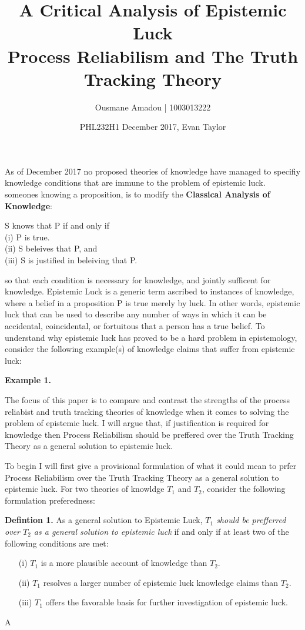 \documentclass{article}
\title{%
  A Critical Analysis of Epistemic Luck \\
  \large Process Reliabilism and The Truth Tracking Theory }
\author{Ousmane Amadou | 1003013222}
\date{PHL232H1 December 2017, Evan Taylor}
\begin{document}
\maketitle

As of December 2017 no proposed theories of knowledge have managed
to specifiy knowledge conditions that are immune to the problem of
epistemic luck. %
someones knowing a proposition, is to modify the \textbf{Classical Analysis of Knowledge}:
\begin{displayquote} %
   S knows that P if and only if \\
  (i) P is true. \\
  (ii) S beleives that P, and \\
  (iii) S is justified in beleiving that P.
\end{displayquote} so that each condition is necessary for knowledge, and jointly
sufficent for knowledge. Epistemic Luck is a generic term ascribed to instances of
knowledge, where a belief in a proposition P is true merely by luck. In other words,
epistemic luck that can be used to describe any number of ways in which it can be
accidental, coincidental, or fortuitous that a person has a true belief. To understand why epistemic luck has
proved to be a hard problem in epistemology, consider the following example(s) of knowledge claims
that suffer from epistemic luck:

\begin{displayquote}
\textbf{Example 1.}
\end{displayquote}
The focus of this paper is to compare and contrast the strengths of the process reliabist and
truth tracking theories of knowledge when it comes to solving the problem
of epistemic luck. I will argue that, if justification is required for
knowledge then Process Reliabilism should be preffered over the Truth Tracking
Theory as a general solution to epistemic luck.

To begin I will first give a provisional formulation of what it could mean to
prfer Process Reliabilism over the Truth Tracking Theory as a general solution to epistemic luck.
For two theories of knowldge $T_{1}$ and $T_{2}$, consider the following
formulation preferedness:
\begin{displayquote}
    \textbf{Defintion 1.} As a general solution to Epistemic Luck,
    \textit{$T_{1}$ should be prefferred over $T_{2}$ as a general solution
    to epistemic luck} if and only if at least two of the following conditions are met:
    \begin{enumerate}
        \item[(i)] $T_{1}$ is a more plausible account of knowledge than $T_{2}$.
        \item[(ii)] $T_{1}$ resolves a larger number of epistemic luck knowledge claims than $T_{2}$.
        \item[(iii)] $T_{1}$ offers the favorable basis for further investigation of epistemic luck.
    \end{enumerate}
\end{displayquote}

A

\end{document}
